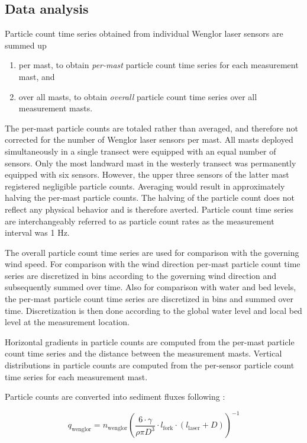 \subsection{Data analysis}

Particle count time series obtained from individual Wenglor laser
sensors are summed up
\begin{enumerate}
\item per mast, to obtain \emph{per-mast} particle count time series
  for each measurement mast, and
\item over all masts, to obtain \emph{overall} particle count time
  series over all measurement masts.
\end{enumerate}
The per-mast particle counts are totaled rather than averaged, and
therefore not corrected for the number of Wenglor laser sensors per
mast. All masts deployed simultaneously in a single transect were
equipped with an equal number of sensors. Only the most landward mast
in the westerly transect was permanently equipped with six
sensors. However, the upper three sensors of the latter mast
registered negligible particle counts. Averaging would result in
approximately halving the per-mast particle counts. The halving of the
particle count does not reflect any physical behavior and is therefore
averted. Particle count time series are interchangeably referred to as
particle count rates as the measurement interval was 1 Hz.

The overall particle count time series are used for comparison with
the governing wind speed. For comparison with the wind direction
per-mast particle count time series are discretized in bins according
to the governing wind direction and subsequently summed over
time. Also for comparison with water and bed levels, the per-mast
particle count time series are discretized in bins and summed over
time. Discretization is then done according to the global water level
and local bed level at the measurement location.

Horizontal gradients in particle counts are computed from the per-mast
particle count time series and the distance between the measurement
masts. Vertical distributions in particle counts are computed from the
per-sensor particle count time series for each measurement mast.

Particle counts are converted into sediment fluxes following
\citet{Barchyn2014}:

\begin{equation}
  q_{\mathrm{wenglor}} = n_{\mathrm{wenglor}} \left( 
    \frac{6 \cdot \gamma}{\rho \pi D^3} \cdot l_{\mathrm{fork}} \cdot \left(
      l_{\mathrm{laser}} + D \right) \right)^{-1}
\end{equation}

